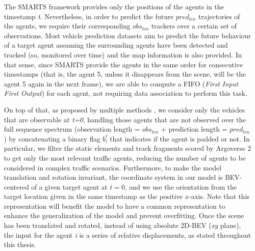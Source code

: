 The \acf{SMARTS} \cite{SMARTS} framework provides only the positions of the agents in the timestamp \textit{t}. Nevertheless, in order to predict the future $pred_{len}$ trajectories of the agents, we require their corresponding $obs_{len}$ trackers over a certain set of observations. Most vehicle prediction datasets \cite{wilson2023argoverse} aim to predict the future behaviour of a target agent assuming the surrounding agents have been detected and tracked (so, monitored over time) and the map information is also provided. In that sense, since \ac{SMARTS} provide the agents in the same order for consecutive timestamps (that is, the agent 5, unless it disappears from the scene, will be the agent 5 again in the next frame), we are able to compute a FIFO (\textit{First Input First Output}) for each agent, not requiring data association \cite{kuhn1955hungarian} to perform this task. 

On top of that, as proposed by multiple methods \cite{liang2020learning, gomez2023improving}, we consider only the vehicles that are observable at \textit{t=0}, handling those agents that are not observed over the full sequence spectrum (observation length = \textit{$obs_{len}$} + prediction length = \textit{$pred_{len}$}) by concatenating a binary flag $b_i^t$ that indicates if the agent is padded or not. In particular, we filter the static elements and track fragments scored by Argoverse 2 to get only the most relevant traffic agents, reducing the number of agents to be considered in complex traffic scenarios. Furthermore, to make the model translation and rotation invariant, the coordinate system in our model is \ac{BEV}-centered of a given target agent at $t = 0$, and we use the orientation from the target location given in the same timestamp as the positive $x$-axis. Note that this representation will benefit the model to have a common representation to enhance the generalization of the model and prevent overfitting. Once the scene has been translated and rotated, instead of using absolute 2D-\ac{BEV} (\textit{xy} plane), the input for the agent \textit{i} is a series of relative displacements, as stated throughout this thesis.

